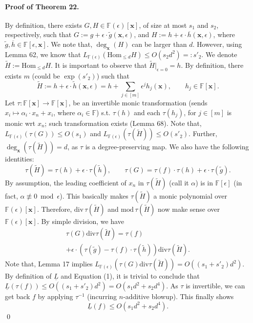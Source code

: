 \documentclass[10pt,a4paper]{article}
\begin{document}
\paragraph{Proof of Theorem 22.} By definition, there exists $G,H\in\mathbb F(\epsilon)[\mathbf x]$, of size at most $s_1$ and $s_2$, respectively, such that $G:=g+\epsilon\cdot\widetilde g(\mathbf x,\epsilon)$, and $H:=h+\epsilon\cdot\overline h(\mathbf x,\epsilon)$, where $\widetilde g,\overline h\in\mathbb F[\epsilon,\mathbf x]$. We note that, $\deg_{\mathbf x}(H)$ can be larger than $d$. However, using Lemma 62, we know that $L_{\mathbb F(\epsilon)}(\mathrm{Hom}_{\le d}H)\le O(s_2d^2)=:s'_2$.
We denote $\widetilde H:=\mathrm{Hom}_{\le d}H$. It is important to observe that $\widetilde H|_{\epsilon=0}=h$. By definition, there exists $m$ (could be $\exp(s'_2)$) such that
\[\widetilde H:=h+\epsilon\cdot\widetilde h(\mathbf x,\epsilon)=h+\sum_{j\in[m]}\epsilon^jh_j(\mathbf x),\qquad h_j\in\mathbb F[\mathbf x].\]
Let $\tau:\mathbb F[\mathbf x]\longrightarrow\mathbb F[\mathbf x]$, be an invertible monic transformation (sends $x_i\mapsto\alpha_i\cdot x_n+x_i$, where $\alpha_i\in\mathbb F$) s.t. $\tau(h)$ and each $\tau(h_j)$, for $j\in[m]$ is monic wrt $x_n$; such transformation exists (Lemma 68). Note that, $L_{\mathbb F(\epsilon)}(\tau(G))\le O(s_1)$ and $L_{\mathbb F(\epsilon)}(\tau(\widetilde H))\le O(s'_2)$. Further, $\deg_{\mathbf x}(\tau(\widetilde H))=d$, as $\tau$ is a degree-preserving map. We also have the following identities:
\[\tau(\widetilde H)=\tau(h)+\epsilon\cdot\tau(\widetilde h),\qquad\tau(G)=\tau(f)\cdot\tau(h)+\epsilon\cdot\tau(\widetilde g).\]
By assumption, the leading coefficient of $x_n$ in $\tau(\widetilde H)$ (call it $\alpha$) is in $\mathbb F[\epsilon]$ (in fact, $\alpha\not\equiv0\bmod\epsilon$). This basically makes $\tau(\widetilde H)$ a monic polynomial over $\mathbb F(\epsilon)[\mathbf x]$. Therefore, $\mathrm{div}\,\tau(\widetilde H)$ and $\mathrm{mod}\,\tau(\widetilde H)$ now make sense over $\mathbb F(\epsilon)[\mathbf x]$. By simple division, we have
\begin{multline*}\tau(G)\mathbin{\mathrm{div}}\tau(\widetilde H)=\tau(f)\\+\epsilon\cdot(\tau(\widetilde g)-\tau(f)\cdot\tau(\widetilde h))\mathbin{\mathrm{div}}\tau(\widetilde H).\tag{1}\end{multline*}
Note that, Lemma 17 implies $L_{\mathbb F(\epsilon)}(\tau(G)\mathbin{\mathrm{div}}\tau(\widetilde H))=O((s_1+s'_2)d^2)$. By definition of $\underline L$ and Equation (1), it is trivial to conclude that $\underline L(\tau(f))\le O((s_1+s'_2)d^2)=O(s_1d^2+s_2d^4)$. As $\tau$ is invertible, we can get back $f$ by applying $\tau^{-1}$ (incurring $n$-additive blowup). This finally shows
\[\underline L(f)\le O(s_1d^2+s_2d^4).\]\qed
\end{document}
